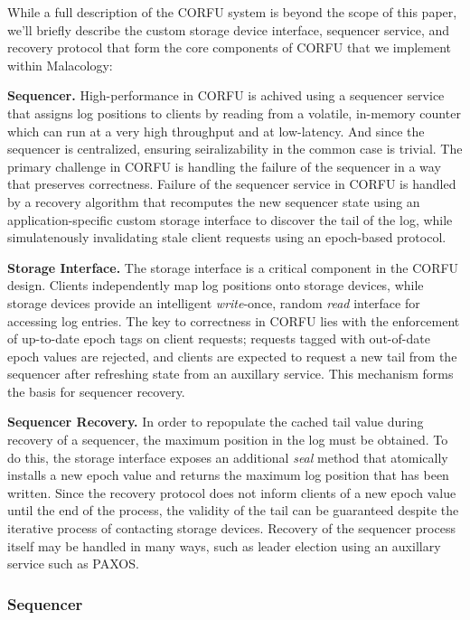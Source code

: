 \documentclass[10pt,twocolumn]{article}
\begin{document}
While a full description of the CORFU system is beyond the scope of this
paper, we'll briefly describe the custom storage device interface, sequencer
service, and recovery protocol that form the core components of CORFU that we
implement within Malacology:

{\bf Sequencer.}
High-performance in CORFU is achived using a sequencer service that assigns
log positions to clients by reading from a volatile, in-memory counter which
can run at a very high throughput and at low-latency. And since the sequencer
is centralized, ensuring seiralizability in the common case is trivial.  The
primary challenge in CORFU is handling the failure of the sequencer in a way
that preserves correctness. Failure of the sequencer service in CORFU is
handled by a recovery algorithm that recomputes the new sequencer state using
an application-specific custom storage interface to discover the tail of the
log, while simulatenously invalidating stale client requests using an
epoch-based protocol.

{\bf Storage Interface.} The storage interface is a critical component in the
CORFU design. Clients independently map log positions onto storage devices,
while storage devices provide an intelligent \emph{write}-once, random
\emph{read} interface for accessing log entries. The key to correctness in
CORFU lies with the enforcement of up-to-date epoch tags on client requests;
requests tagged with out-of-date epoch values are rejected, and clients are
expected to request a new tail from the sequencer after refreshing state from
an auxillary service. This mechanism forms the basis for sequencer recovery.

{\bf Sequencer Recovery.}
In order to repopulate the cached tail value during recovery of a sequencer,
the maximum position in the log must be obtained. To do this, the storage
interface exposes an additional \emph{seal} method that atomically installs a
new epoch value and returns the maximum log position that has been written.
Since the recovery protocol does not inform clients of a new epoch value until
the end of the process, the validity of the tail can be guaranteed despite the
iterative process of contacting storage devices.  Recovery of the sequencer
process itself may be handled in many ways, such as leader election using an
auxillary service such as PAXOS.

\subsubsection{Sequencer}
\end{document}
